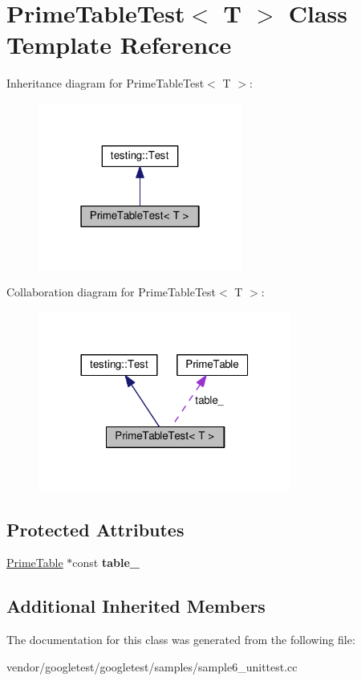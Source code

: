 \hypertarget{class_prime_table_test}{}\section{Prime\+Table\+Test$<$ T $>$ Class Template Reference}
\label{class_prime_table_test}


Inheritance diagram for Prime\+Table\+Test$<$ T $>$\+:
\nopagebreak
\begin{figure}[H]
\begin{center}
\leavevmode
\includegraphics[width=190pt]{class_prime_table_test__inherit__graph}
\end{center}
\end{figure}


Collaboration diagram for Prime\+Table\+Test$<$ T $>$\+:
\nopagebreak
\begin{figure}[H]
\begin{center}
\leavevmode
\includegraphics[width=236pt]{class_prime_table_test__coll__graph}
\end{center}
\end{figure}
\subsection*{Protected Attributes}
\begin{DoxyCompactItemize}
\item 
\mbox{\label{class_prime_table_test_a86da90fc6d5cef6386d0cd8fb52b4046}} 
\mbox{\hyperlink{class_prime_table}{Prime\+Table}} $\ast$const {\bfseries table\+\_\+}
\end{DoxyCompactItemize}
\subsection*{Additional Inherited Members}


The documentation for this class was generated from the following file\+:\begin{DoxyCompactItemize}
\item 
vendor/googletest/googletest/samples/sample6\+\_\+unittest.\+cc\end{DoxyCompactItemize}
